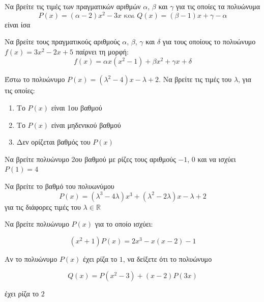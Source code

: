 \documentclass{presentation}
\begin{document}
\begin{askisi}
  Να βρείτε τις τιμές των πραγματικών αριθμών $α$, $β$ και $γ$ για τις οποίες τα πολυώνυμα
  $$P(x)=(α-2)x^2-3x \text{ και } Q(x)=(β-1)x+γ-α$$
  είναι ίσα

\end{askisi}

\begin{askisi}
  Να βρείτε τους πραγματικούς αριθμούς $α$, $β$, $γ$ και $δ$ για τους οποίους το πολυώνυμο $f(x)=3x^2-2x+5$ παίρνει τη μορφή:
  $$f(x)=αx(x^2-1)+βx^2+γx+δ$$

\end{askisi}

\begin{askisi}
  Έστω το πολυώνυμο $P(x)=(λ^2-4)x-λ+2$. Να βρείτε τις τιμές του $λ$, για τις οποίες:
  \begin{enumerate}
    \item<1-> Το $P(x)$ είναι 1ου βαθμού
    \item<2-> Το $P(x)$ είναι μηδενικού βαθμού
    \item<3-> Δεν ορίζεται βαθμός του $P(x)$
  \end{enumerate}

\end{askisi}

\begin{askisi}
  Να βρείτε πολυώνυμο 2ου βαθμού με ρίζες τους αριθμούς $-1$, $0$ και να ισχύει $P(1)=4$

\end{askisi}

\begin{askisi}
  Να βρείτε το βαθμό του πολυωνύμου
  $$P(x)=(λ^3-4λ)x^3+(λ^2-2λ)x-λ+2$$
  για τις διάφορες τιμές του $λ\in\mathbb{R}$

\end{askisi}

\begin{askisi}
  Να βρείτε πολυώνυμο $P(x)$ για το οποίο ισχύει:

  $$(x^2+1)P(x)=2x^3-x(x-2)-1$$

\end{askisi}

\begin{askisi}
  Αν το πολυώνυμο $P(x)$ έχει ρίζα το $1$, να δείξετε ότι το πολυώνυμο

  $$Q(x)=P(x^2-3)+(x-2)P(3x)$$

  έχει ρίζα το $2$

\end{askisi}
\end{document}
